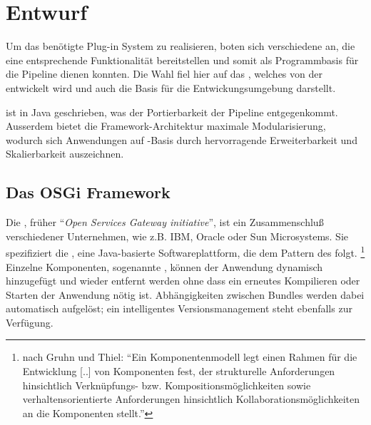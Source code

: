 \chapter{Entwurf}
Um das benötigte Plug-in System zu realisieren, boten sich verschiedene
 an, die eine entsprechende Funktionalität
bereitstellen und somit als Programmbasis für die  Pipeline dienen konnten.
Die Wahl fiel hier auf das  , welches von
der  entwickelt wird und auch die Basis für die
Entwickungsumgebung  darstellt.

 ist in Java geschrieben, was der Portierbarkeit der
Pipeline entgegenkommt. Ausserdem bietet die Framework-Architektur maximale
Modularisierung, wodurch sich Anwendungen auf -Basis durch
hervorragende Erweiterbarkeit und Skalierbarkeit auszeichnen.
\section{Das OSGi Framework}


Die , früher \enquote{\textit{Open Services Gateway
initiative}}, ist ein Zusammenschluß verschiedener Unternehmen, wie z.B. IBM,
Oracle oder Sun Microsystems.
Sie spezifiziert die , eine Java-basierte
Softwareplattform, die dem Pattern des  folgt.
\footnote{nach Gruhn und Thiel\citep{gruhn_komponentenmodelle_2000}:
\enquote{Ein Komponentenmodell legt einen Rahmen für die Entwicklung [..] von
Komponenten fest, der strukturelle Anforderungen hinsichtlich Verknüpfungs-
bzw. Kompositionsmöglichkeiten sowie verhaltensorientierte Anforderungen
hinsichtlich Kollaborationsmöglichkeiten an die Komponenten stellt.}}
Einzelne Komponenten, sogenannte , können der Anwendung
dynamisch hinzugefügt und wieder entfernt werden ohne dass ein erneutes
Kompilieren oder Starten der Anwendung nötig ist.
Abhängigkeiten zwischen Bundles werden dabei automatisch aufgelöst; ein
intelligentes Versionsmanagement steht ebenfalls zur Verfügung.

